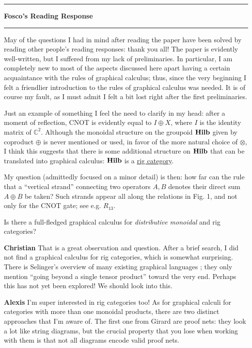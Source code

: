 \documentclass{amsart}
\newcommand{\iam}[1]{
  \vspace{0.25em}
  \hrule
  \vspace{0.25em}
  \textbf{{#1}'s Reading Response}
  \vspace{0.25em}
  \hrule
  \vspace{1em}
}
\newcommand{\respond}[1]{
  \vspace{1em} \textbf{#1}
}
\begin{document}
\iam{Fosco}

May of the questions I had in mind after reading the  paper have been solved by reading other people's reading responses: thank you all! The paper is evidently well-written, but I suffered from my lack of preliminaries. In particular, I am completely new to most of the aspects discussed here apart having a certain acquaintance with the rules of graphical calculus; thus, since the very beginning I felt a friendlier introduction to the rules of graphical calculus was needed. It is of course my fault, as I must admit I felt a bit lost right after the first preliminaries.

Just an example of something I feel the need to clarify in my head: after a moment of reflection, CNOT is evidently equal to $I\oplus X$, where $I$ is the identity matrix of $\mathbb C^2$. Although the monoidal structure on the groupoid $\bf Hilb$ given by coproduct $\oplus$ is never mentioned or used, in favor of the more natural choice of $\otimes$, I think this suggests that there is some additional structure on $\bf Hilb$ that can be translated into graphical calculus: $\bf Hilb$ is a \href{https://ncatlab.org/nlab/show/rig+category}{rig category}.

My question (admittedly focused on a minor detail) is then: how far can the rule that a ``vertical strand'' connecting two operators $A,B$ denotes their direct sum $A\oplus B$ be taken? Such strands appear all along the relations in Fig. 1, and not only for the CNOT gate; see e.g. $R_{13}$.

Is there a full-fledged graphical calculus for \emph{distributive monoidal} and rig categories?

\respond{Christian} That is a great observation and question. After a brief search, I did not find a graphical calculus for rig categories, which is somewhat surprising. There is Selinger's overview of many existing graphical languages \cite{SelingerSurvey}; they only mention ``going beyond a single tensor product'' toward the very end. Perhaps this has not yet been explored! We should look into this.

\respond{Alexis} I'm super interested in rig categories too! As for graphical calculi for categories with more than one monoidal products, there are two distinct approaches that I'm aware of. The first one from Girard are proof nets: they look a lot like string diagrams, but the crucial property that you lose when working with them is that not all diagrams encode valid proof nets.
\end{document}
